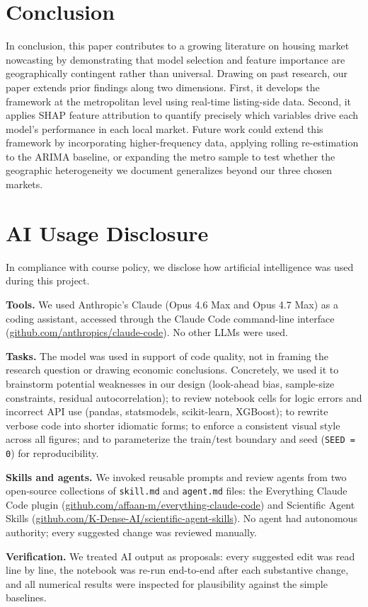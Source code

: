\section{Conclusion}
In conclusion, this paper contributes to a growing literature on housing market nowcasting by demonstrating that model selection and feature importance are geographically contingent rather than universal. Drawing on past research, our paper extends prior findings along two dimensions. First, it develops the framework at the metropolitan level using real-time listing-side data. Second, it applies SHAP feature attribution to quantify precisely which variables drive each model's performance in each local market. Future work could extend this framework by incorporating higher-frequency data, applying rolling re-estimation to the ARIMA baseline, or expanding the metro sample to test whether the geographic heterogeneity we document generalizes beyond our three chosen markets.

\section{AI Usage Disclosure}

In compliance with course policy, we disclose how artificial intelligence was used during this project.

\textbf{Tools.} We used Anthropic's Claude (Opus 4.6 Max and Opus 4.7 Max) as a coding assistant, accessed through the Claude Code command-line interface (\href{https://github.com/anthropics/claude-code}{github.com/anthropics/claude-code}). No other LLMs were used.

\textbf{Tasks.} The model was used in support of code quality, not in framing the research question or drawing economic conclusions. Concretely, we used it to brainstorm potential weaknesses in our design (look-ahead bias, sample-size constraints, residual autocorrelation); to review notebook cells for logic errors and incorrect API use (pandas, statsmodels, scikit-learn, XGBoost); to rewrite verbose code into shorter idiomatic forms; to enforce a consistent visual style across all figures; and to parameterize the train/test boundary and seed (\texttt{SEED = 0}) for reproducibility.

\textbf{Skills and agents.} We invoked reusable prompts and review agents from two open-source collections of \texttt{skill.md} and \texttt{agent.md} files: the Everything Claude Code plugin (\href{https://github.com/affaan-m/everything-claude-code}{github.com/affaan-m/everything-claude-code}) and Scientific Agent Skills (\href{https://github.com/K-Dense-AI/scientific-agent-skills}{github.com/K-Dense-AI/scientific-agent-skills}). No agent had autonomous authority; every suggested change was reviewed manually.

\textbf{Verification.} We treated AI output as proposals: every suggested edit was read line by line, the notebook was re-run end-to-end after each substantive change, and all numerical results were inspected for plausibility against the simple baselines.